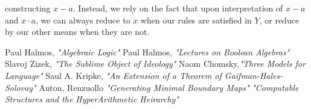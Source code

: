 \documentclass[12pt]{amsart}
\begin{document}
constructing $x-a$. Instead, we rely on the fact that upon interpretation of $x-a$ and $x\cdot a$, we can always reduce to $x$ when our rules are satisfied in $Y$, or reduce by our other means when they are not.



\begin{thebibliography}{1}
	 Paul Halmos, \emph{ "Algebraic Logic" }
	 Paul Halmos, \emph{"Lectures on Boolean Algebras"}
	 Slavoj Zizek, \emph{"The Sublime Object of Ideology"}
	 Naom Chomsky,\emph{"Three Models for Language"}
	 Saul A. Kripke, \emph{"An Extension of a Theorem of Gaifman-Hales-Solovay"}
	 Anton, Renzuollo \emph{"Generating Minimal Boundary Maps"}
	 \emph{"Computable Structures and the HyperArithmetic Heirarchy"}
\end{thebibliography}
\end{document}
